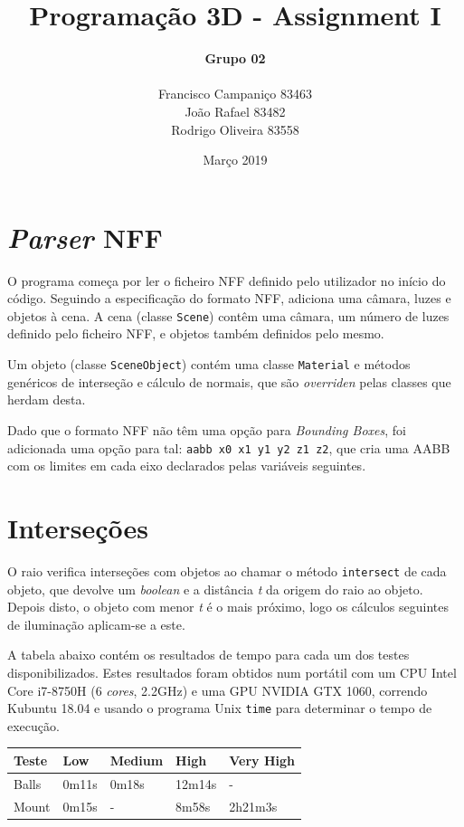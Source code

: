 \documentclass{article}
\title{
    \textbf{Programação 3D - Assignment I}
    }
\author{
    \begin{Large}
        \textbf{Grupo 02}
    \end{Large}\\
    Francisco Campaniço 83463\\
    João Rafael 83482\\
    Rodrigo Oliveira 83558
}
\date{Março 2019}
\begin{document}
    \maketitle

    \section*{\textit{Parser} NFF}

        \par 
        O programa começa por ler o ficheiro NFF definido pelo utilizador no início do código. Seguindo a especificação do formato NFF, adiciona uma câmara, luzes e objetos à cena. A cena (classe \texttt{Scene}) contêm uma câmara, um número de luzes definido pelo ficheiro NFF, e objetos também definidos pelo mesmo.
        \par
        Um objeto (classe \texttt{SceneObject}) contém uma classe \texttt{Material} e métodos genéricos de interseção e cálculo de normais, que são \textit{overriden} pelas classes que herdam desta.
        \par
        Dado que o formato NFF não têm uma opção para \textit{Bounding Boxes}, foi adicionada uma opção para tal: \texttt{aabb x0 x1 y1 y2 z1 z2}, que cria uma AABB com os limites em cada eixo declarados pelas variáveis seguintes.

    \section*{Interseções}

        \par
        O raio verifica interseções com objetos ao chamar o método \texttt{intersect} de cada objeto, que devolve um \textit{boolean} e a distância \textit{t} da origem do raio ao objeto. Depois disto, o objeto com menor \textit{t} é o mais próximo, logo os cálculos seguintes de iluminação aplicam-se a este.

        \par
        A tabela abaixo contém os resultados de tempo para cada um dos testes disponibilizados. Estes resultados foram obtidos num portátil com um CPU Intel Core i7-8750H (6 \textit{cores}, 2.2GHz) e uma GPU NVIDIA GTX 1060, correndo Kubuntu 18.04 e usando o programa Unix \texttt{time} para determinar o tempo de execução.

        \begin{table}[h]
            \centering
            \begin{tabular}{|l|l|l|l|l|}
                \hline
                Teste & Low     & Medium    & High     & Very High \\ \hline
                Balls & 0m11s   & 0m18s     & 12m14s   & -         \\ \hline
                Mount & 0m15s   & -         & 8m58s    & 2h21m3s   \\ \hline
            \end{tabular}
        \end{table}
\end{document}
